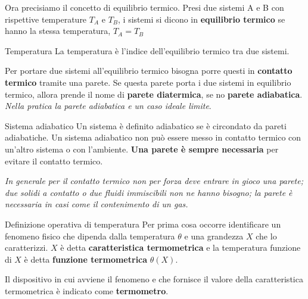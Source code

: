 \documentclass[x11names]{report}
\begin{document}
	\noindent
	Ora precisiamo il concetto di equilibrio termico. Presi due sistemi A e B con rispettive temperature \(T_A\) e \(T_B\), i sistemi si dicono in \textbf{equilibrio termico} se hanno la stessa temperatura, \(T_A = T_B\)
	\begin{center}
		\colorbox{yblue}{\begin{minipage}{5.75in}
				\begin{blues}{Temperatura}
					La temperatura è l'indice dell'equilibrio termico tra due sistemi.
				\end{blues}
		\end{minipage}}
	\end{center}
	
	Per portare due sistemi all'equilibrio termico bisogna porre questi in \textbf{contatto termico} tramite una parete. Se questa parete porta i due sistemi in equilibrio termico, allora prende il nome di  \textbf{parete diatermica}, se no \textbf{parete adiabatica}. \textit{Nella pratica la parete adiabatica e un caso ideale limite}. 
	
	\begin{center}
		\colorbox{yblue}{\begin{minipage}{5.75in}
				\begin{blues}{Sistema adiabatico}
					Un sistema è definito adiabatico se è circondato da pareti adiabatiche. Un sistema adiabatico non può essere messo in contatto termico con un'altro sistema o con l'ambiente. \textbf{Una parete è sempre necessaria} per evitare il contatto termico.
				\end{blues}
		\end{minipage}}
	\end{center}
	
	\textit{In generale per il contatto termico non per forza deve entrare in gioco una parete; due solidi a contatto o due fluidi immiscibili non ne hanno bisogno; la parete è necessaria in casi come il contenimento di un gas.}
	
	\begin{center}
		\colorbox{yblue}{\begin{minipage}{5.75in}
				\begin{blues}{Definizione operativa di temperatura}
					Per prima cosa occorre identificare un fenomeno fisico che dipenda dalla temperatura \(\theta\) e una grandezza \(X\) che lo caratterizzi. \(X\) è detta \textbf{caratteristica termometrica} e la temperatura funzione di \(X\) è detta \textbf{funzione termometrica} \(\theta(X)\).
					
					Il dispositivo in cui avviene il fenomeno e che fornisce il valore della caratteristica termometrica è indicato come \textbf{termometro}.
				\end{blues}
		\end{minipage}}
	\end{center}
	
\end{document}
